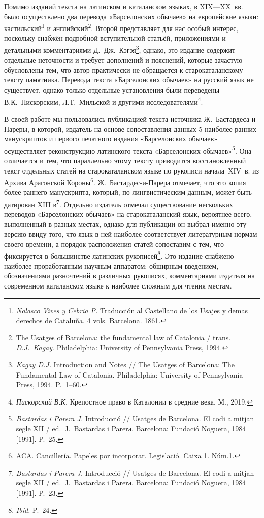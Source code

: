 Помимо изданий текста на латинском и каталанском языках, в XIX---XX~вв. было осуществлено два перевода «Барселонских обычаев» на европейские языки: кастильский\footnote{\emph{Nolasco Vives y Cebria P. }Traducción al Castellano de los Usajes y demas derechos de Cataluña. 4 vols. Barcelona. 1861.} и английский\footnote{The Usatges of Barcelona: the fundamental law of Catalonia / trans. \emph{D.J.~Kagay}. Philadelphia: University of Pennsylvania Press, 1994.}. Второй представляет для нас особый интерес, поскольку снабжён подробной вступительной статьёй, приложениями и детальными комментариями Д.~Дж.~Кэгэя\footnote{\emph{ }\emph{Kagay D.J}\emph{.} Introduction and Notes // The Usatges of Barcelona: The Fundamental Law of Catalonia. Philadelphia: University of Pennsylvania Press, 1994. P.~1--60.}, однако, это издание содержит отдельные неточности и требует дополнений и пояснений, которые зачастую обусловлены тем, что автор практически не обращается к старокаталанскому тексту памятника. Перевода текста «Барселонских обычаев» на русский язык не существует, однако только отдельные установления были переведены В.К.~Пискорским, Л.Т.~Мильской и другими исследователями\footnote{\emph{Пискорский}\emph{ В.К.} Крепостное право в Каталонии в средние века. М., 2019.}.

В своей работе мы пользовались публикацией текста источника Ж.~Бастардеса-и-Пареры, в которой, издатель на основе сопоставления данных 5 наиболее ранних манускриптов и первого печатного издания «Барселонских обычаев» осуществляет реконструкцию латинского текста «Барселонских обычаев»\footnote{\emph{Bastardas i Parera J. }Introducció // Usatges de Barcelona. El codi a mitjan segle XII / ed.~J.~Bastardas i Parerа. Barcelona: Fundació Noguera, 1984 [1991]. P.~25.}. Она отличается и тем, что параллельно этому тексту приводится восстановленный текст отдельных статей на старокаталанском языке по рукописи начала~XIV~в. из Архива Арагонской Короны\footnote{ACA. Cancillería. Papeles por incorporar. Legislació. Caixa 1. Núm.1.}. Ж.~Бастардес-и-Парера отмечает, что это копия более раннего манускрипта, который, по лингвистическим данным, может быть датирован XIII в\footnote{\emph{Bastardas i Parera J. }Introducció // Usatges de Barcelona. El codi a mitjan segle XII / ed.~J.~Bastardas i Parerа. Barcelona: Fundació Noguera, 1984 [1991]. P.~23.}. Отдельно издатель отмечал существование нескольких переводов «Барселонских обычаев» на старокаталанский язык, вероятнее всего, выполненный в разных местах, однако для публикации он выбрал именно эту версию ввиду того, что язык в ней наиболее соответствует литературным нормам своего времени, а порядок расположения статей сопоставим с тем, что фиксируется в большинстве латинских рукописей\footnote{\emph{ Ibid.} P.~24.}. Это издание снабжено наиболее проработанным научным аппаратом: обширным введением, обозначениями разночтений в различных рукописях, комментариями издателя на современном каталанском языке к наиболее сложным для чтения местам.

